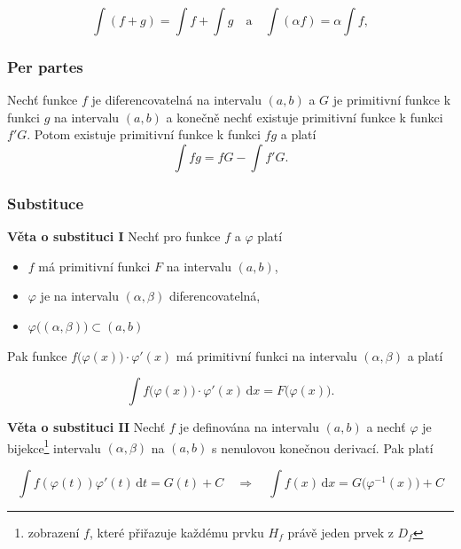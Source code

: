 \documentclass{szzclass}
\begin{document}
\begin{equation*}
\int (f+g) = \int f + \int g \quad \text{a} \quad \int (\alpha f) = \alpha \int f,\end{equation*}

\subsubsection{Per partes}
Nechť funkce $f$ je diferencovatelná na intervalu $(a,b)$ a $G$ je primitivní funkce
k funkci $g$ na intervalu $(a,b)$ a konečně nechť existuje primitivní funkce k funkci
$f'G$. Potom existuje primitivní funkce k funkci $fg$ a platí
\begin{equation*}
\int fg = f G - \int f' G.\end{equation*}

\newpage

\subsubsection{Substituce}

\textbf{Věta o substituci I}\newline
Nechť pro funkce $f$ a $\varphi$ platí
\begin{itemize}
    \item $f$ má primitivní funkci $F$ na intervalu $(a,b)$,
    \item $\varphi$ je na intervalu $(\alpha,\beta)$ diferencovatelná,
    \item $\varphi\big((\alpha,\beta)\big) \subset (a,b)$
\end{itemize}
Pak funkce $f\big(\varphi(x)\big)\cdot\varphi'(x)$ má primitivní funkci na intervalu $(\alpha,\beta)$ a platí

\begin{equation*}
\int f\big(\varphi(x)\big)\cdot\varphi'(x) \,\mathrm{d}x = F\big( \varphi(x) \big).\end{equation*}


\textbf{Věta o substituci II}\newline
Nechť $f$ je definována na intervalu $(a,b)$ a nechť $\varphi$ je
bijekce\footnote{zobrazení $f$, které přiřazuje každému prvku $H_f$ právě jeden prvek z $D_f$}
intervalu $(\alpha,\beta)$ na $(a,b)$ s nenulovou konečnou derivací. Pak platí

\begin{equation*}
\int f(\varphi(t)) \varphi'(t) \,\mathrm{d}t = G(t) + C \quad \Longrightarrow \quad \int f(x) \,\mathrm{d}x = G\big(\varphi^{-1}(x)\big) + C\end{equation*}
\end{document}
